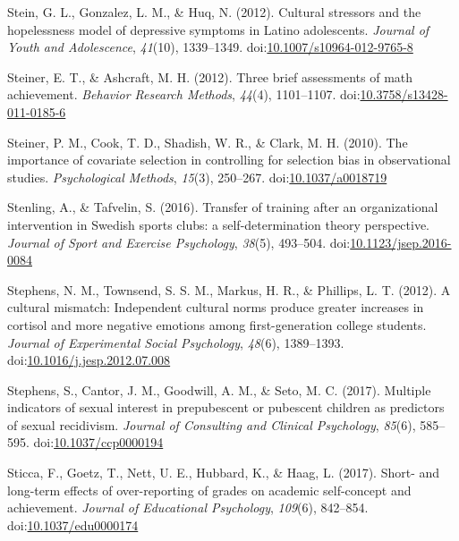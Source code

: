 \documentclass[english,man]{apa6}
\theoremstyle{definition}
\theoremstyle{definition}
\theoremstyle{definition}
\theoremstyle{remark}
\begin{document}
\hypertarget{ref-Stein2012}{}
Stein, G. L., Gonzalez, L. M., \& Huq, N. (2012). Cultural stressors and
the hopelessness model of depressive symptoms in Latino adolescents.
\emph{Journal of Youth and Adolescence}, \emph{41}(10), 1339--1349.
doi:\href{https://doi.org/10.1007/s10964-012-9765-8}{10.1007/s10964-012-9765-8}

\hypertarget{ref-Steiner2012}{}
Steiner, E. T., \& Ashcraft, M. H. (2012). Three brief assessments of
math achievement. \emph{Behavior Research Methods}, \emph{44}(4),
1101--1107.
doi:\href{https://doi.org/10.3758/s13428-011-0185-6}{10.3758/s13428-011-0185-6}

\hypertarget{ref-Steiner2010}{}
Steiner, P. M., Cook, T. D., Shadish, W. R., \& Clark, M. H. (2010). The
importance of covariate selection in controlling for selection bias in
observational studies. \emph{Psychological Methods}, \emph{15}(3),
250--267. doi:\href{https://doi.org/10.1037/a0018719}{10.1037/a0018719}

\hypertarget{ref-Stenling2016}{}
Stenling, A., \& Tafvelin, S. (2016). Transfer of training after an
organizational intervention in Swedish sports clubs: a
self-determination theory perspective. \emph{Journal of Sport and
Exercise Psychology}, \emph{38}(5), 493--504.
doi:\href{https://doi.org/10.1123/jsep.2016-0084}{10.1123/jsep.2016-0084}

\hypertarget{ref-Stephens2012}{}
Stephens, N. M., Townsend, S. S. M., Markus, H. R., \& Phillips, L. T.
(2012). A cultural mismatch: Independent cultural norms produce greater
increases in cortisol and more negative emotions among first-generation
college students. \emph{Journal of Experimental Social Psychology},
\emph{48}(6), 1389--1393.
doi:\href{https://doi.org/10.1016/j.jesp.2012.07.008}{10.1016/j.jesp.2012.07.008}

\hypertarget{ref-Stephens2017a}{}
Stephens, S., Cantor, J. M., Goodwill, A. M., \& Seto, M. C. (2017).
Multiple indicators of sexual interest in prepubescent or pubescent
children as predictors of sexual recidivism. \emph{Journal of Consulting
and Clinical Psychology}, \emph{85}(6), 585--595.
doi:\href{https://doi.org/10.1037/ccp0000194}{10.1037/ccp0000194}

\hypertarget{ref-Sticca2017}{}
Sticca, F., Goetz, T., Nett, U. E., Hubbard, K., \& Haag, L. (2017).
Short- and long-term effects of over-reporting of grades on academic
self-concept and achievement. \emph{Journal of Educational Psychology},
\emph{109}(6), 842--854.
doi:\href{https://doi.org/10.1037/edu0000174}{10.1037/edu0000174}
\end{document}
